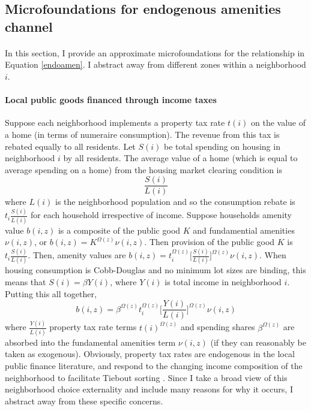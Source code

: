 \documentclass[12pt]{article}
\begin{document}
	\subsection{Microfoundations for endogenous amenities channel}\label{microfoundations}
	
	\paragraph*{}
	In this section, I provide an approximate microfoundations for the relationship in Equation \eqref{endoamen}. I abstract away from different zones within a neighborhood $i$.

	\paragraph*{Local public goods financed through income taxes} Suppose each neighborhood implements a property tax rate $t(i)$ on the value of a home (in terms of numeraire consumption). The revenue from this tax is rebated equally to all residents. Let $S(i)$ be total spending on housing in neighborhood $i$ by all residents. The average value of a home (which is equal to average spending on a home) from the housing market clearing condition is $$\frac{S(i)}{L(i)}$$ where $L(i)$ is the neighborhood population and so the consumption rebate is $t_{i}\frac{S(i)}{L(i)}$ for each household irrespective of income. Suppose households amenity value $b(i, z)$ is a composite of the public good $K$ and fundamential amenities $\nu(i, z)$, or $b(i, z) = K^{\Omega(z)}\nu(i, z)$. Then provision of the public good $K$ is $t_{i}\frac{S(i)}{L(i)}$. Then, amenity values are $b(i, z) = t_{i}^{\Omega(z)}\bigg[\frac{S(i)}{L(i)}\bigg]^{\Omega(z)}\nu(i, z)$. When housing consumption is Cobb-Douglas and no minimum lot sizes are binding, this means that $S(i) = \beta Y(i)$, where $Y(i)$ is total income in neighborhood $i$. Putting this all together, $$b(i, z) = \beta^{\Omega(z)}t_{i}^{\Omega(z)}\bigg[\frac{Y(i)}{L(i)}\bigg]^{\Omega(z)}\nu(i, z)$$ where $\frac{Y(i)}{L(i)}$ property tax rate terms $t(i)^{\Omega(z)}$ and spending shares $\beta^{\Omega(z)}$ are absorbed into the fundamental amenities term $\nu(i, z)$ (if they can reasonably be taken as exogenous). Obviously, property tax rates are endogenous in the local public finance literature, and respond to the changing income composition of the neighborhood to facilitate Tiebout sorting \citep{calabresetal, ineffTiebout}. Since I take a broad view of this neighborhood choice externality and include many reasons for why it occurs, I abstract away from these specific concerns. 
	
\end{document}
